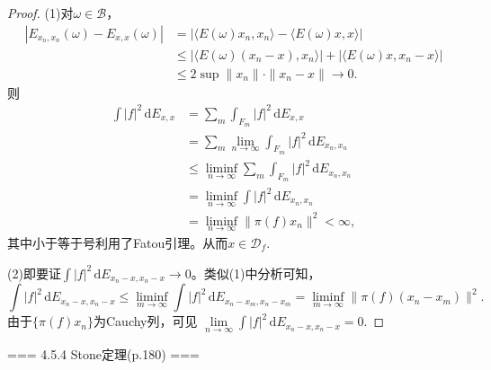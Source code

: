 \begin{enumerate}
\begin{proof}
(1)对$\omega\in \mathcal{B}$，
\begin{align*}
    |E_{x_n,x_n}(\omega)-E_{x,x}(\omega)|&=|\langle E(\omega)x_n,x_n \rangle-\langle E(\omega)x,x \rangle|\\
    &\leqslant |\langle E(\omega)(x_n-x),x_n\rangle|+|\langle E(\omega)x,x_n-x\rangle| \\
    &\leqslant 2\sup{\|x_n\|} \cdot \|x_n-x\| \rightarrow 0.
\end{align*}
则\begin{align*}
    \int |f|^2\,\mathrm{d}E_{x,x}&=\sum_m\int_{F_m} |f|^2\,\mathrm{d}E_{x,x}\\
    &=\sum_m\lim_{n \to \infty}\int_{F_m} |f|^2\,\mathrm{d}E_{x_n,x_n}\\
    &\leqslant \liminf_{n \to \infty}\sum_m \int_{F_m} |f|^2\,\mathrm{d}E_{x_n,x_n}\\
    &=\liminf_{n \to \infty}\int |f|^2\,\mathrm{d}E_{x_n,x_n}\\
    &=\liminf_{n \to \infty}\|\pi(f)x_n\|^2<\infty,
\end{align*}
其中小于等于号利用了Fatou引理。从而$x\in \mathcal{D}_f$.

(2)即要证$\int |f|^2\,\mathrm{d}E_{x_n-x,x_n-x}\to 0$。类似(1)中分析可知，
$$\int |f|^2\,\mathrm{d}E_{x_n-x,x_n-x}
\leqslant \liminf_{m \to \infty}\int |f|^2\,\mathrm{d}E_{x_n-x_m,x_n-x_m}
=\liminf_{m \to \infty}\|\pi(f)(x_n-x_m)\|^2.$$
由于$\{\pi(f)x_n\}$为Cauchy列，可见
$\lim\limits_{n \to \infty}\int |f|^2\,\mathrm{d}E_{x_n-x,x_n-x}=0$.
\end{proof}
\end{enumerate}

=== 4.5.4 Stone定理(p.180) ===

